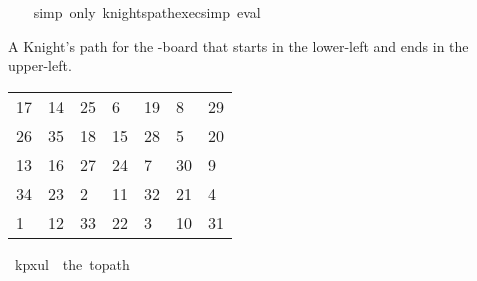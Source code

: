 \begin{isabellebody}
%
\isadelimproof
\ \ %
\endisadelimproof
%
\isatagproof
{}\isamarkupfalse%
\ {\isacharparenleft}{\kern0pt}simp\ only{\isacharcolon}{\kern0pt}\ knights{\isacharunderscore}{\kern0pt}path{\isacharunderscore}{\kern0pt}exec{\isacharunderscore}{\kern0pt}simp{\isacharparenright}{\kern0pt}\ eval%
\endisatagproof
{\isafoldproof}%
%
\isadelimproof
%
\endisadelimproof
%
\begin{isamarkuptext}%
A Knight's path for the -board that starts in the lower-left and ends in the 
upper-left.
  \begin{table}[H]
    \begin{tabular}{lllllll}
      17 & 14 & 25 &  6 & 19 &  8 & 29 \\
      26 & 35 & 18 & 15 & 28 &  5 & 20 \\
      13 & 16 & 27 & 24 &  7 & 30 &  9 \\
      34 & 23 &  2 & 11 & 32 & 21 &  4 \\
       1 & 12 & 33 & 22 &  3 & 10 & 31
    \end{tabular}
  \end{table}%
\end{isamarkuptext}\isamarkuptrue%
\isamarkupfalse%
\ {\isachardoublequoteopen}kp{}x{}ul\ {\isasymequiv}\ the\ {\isacharparenleft}{\kern0pt}to{\isacharunderscore}{\kern0pt}path\ \isanewline
\ \ {\isacharbrackleft}{\kern0pt}{\isacharbrackleft}{\kern0pt}{}{}{\isacharcomma}{\kern0pt}{}{}{\isacharcomma}{\kern0pt}{}{}{\isacharcomma}{\kern0pt}{}{\isacharcomma}{\kern0pt}{}{}{\isacharcomma}{\kern0pt}{}{\isacharcomma}{\kern0pt}{}{}{\isacharbrackright}{\kern0pt}{\isacharcomma}{\kern0pt}\isanewline
\ \ {\isacharbrackleft}{\kern0pt}{}{}{\isacharcomma}{\kern0pt}{}{}{\isacharcomma}{\kern0pt}{}{}{\isacharcomma}{\kern0pt}{}{}{\isacharcomma}{\kern0pt}{}{}{\isacharcomma}{\kern0pt}{}{\isacharcomma}{\kern0pt}{}{}{\isacharbrackright}{\kern0pt}{\isacharcomma}{\kern0pt}\isanewline
\ \ {\isacharbrackleft}{\kern0pt}{}{}{\isacharcomma}{\kern0pt}{}{}{\isacharcomma}{\kern0pt}{}{}{\isacharcomma}{\kern0pt}{}{}{\isacharcomma}{\kern0pt}{}{\isacharcomma}{\kern0pt}{}{}{\isacharcomma}{\kern0pt}{}{\isacharbrackright}{\kern0pt}{\isacharcomma}{\kern0pt}\isanewline

\end{isabellebody}
